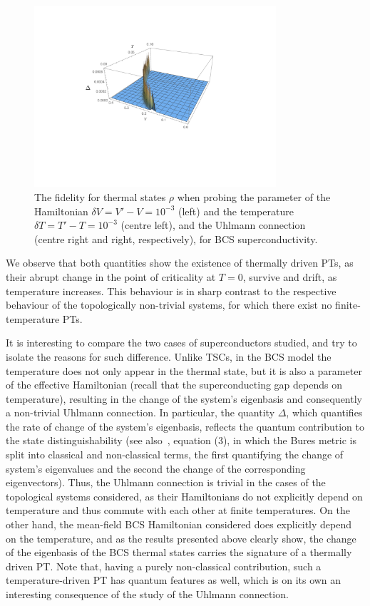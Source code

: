 \begin{figure}[h!]
\begin{minipage}{0.24\textwidth}
\end{minipage}%
\begin{minipage}{0.24\textwidth}
\includegraphics[width=0.8\textwidth,height=0.6\textwidth]{BCS_delta_T.pdf}
\end{minipage}
\caption{The fidelity for thermal states $\rho$ when probing the parameter of the Hamiltonian $\delta V =V'-V=10^{-3}$ (left) and the temperature $\delta T=T'-T=10^{-3}$ (centre left), and the Uhlmann connection (centre right and right, respectively), for BCS superconductivity.}
\label{fig:bcs}
\end{figure}
We observe that both quantities show the existence of thermally driven PTs, as their abrupt change in the point of criticality at $T=0$, survive and drift, as temperature increases. This behaviour is in sharp contrast to the respective behaviour of the topologically non-trivial systems, for which there exist no finite-temperature PTs.

It is interesting to compare the two cases of superconductors studied, and try to isolate the reasons for such difference. 
Unlike TSCs, in the BCS model the temperature does not only appear in the thermal state, but it is also a parameter of the effective Hamiltonian (recall that the superconducting gap depends on temperature), resulting in the change of the system's eigenbasis and consequently a non-trivial Uhlmann connection. In particular, the quantity $\Delta$, which quantifies the rate of change of the system's eigenbasis, reflects the quantum contribution to the state distinguishability (see also~\cite{zan:ven:gio:07}, equation (3), in which the Bures metric is split into classical and non-classical terms, the first quantifying the change of system's eigenvalues and the second the change of the corresponding eigenvectors). Thus, the Uhlmann connection is trivial in the cases of the topological systems considered, as their Hamiltonians do not explicitly depend on temperature and thus commute with each other at finite temperatures. On the other hand, the mean-field BCS Hamiltonian considered does explicitly depend on the temperature, and as the results presented above clearly show, the change of the eigenbasis of the BCS thermal states carries the signature of a thermally driven PT. Note that, having a purely non-classical contribution, such a temperature-driven PT has quantum features as well, which is on its own an interesting consequence of the study of the Uhlmann connection.

